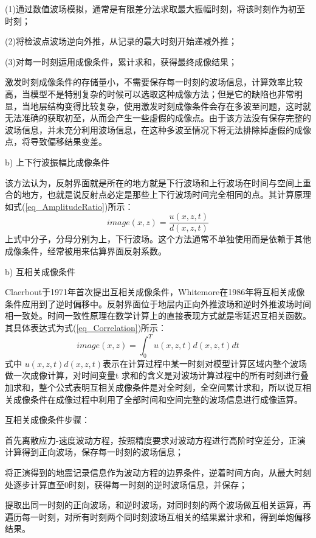 \documentclass[11pt]{article}
\begin{document}
(1)通过数值波场模拟，通常是有限差分法求取最大振幅时刻，将该时刻作为初至时刻；
\par
(2)将检波点波场逆向外推，从记录的最大时刻开始递减外推；
\par
(3)对每一时刻运用成像条件，累计求和，获得最终成像结果；
\par
激发时刻成像条件的存储量小，不需要保存每一时刻的波场信息，计算效率比较高，当模型不是特别复杂的时候可以选取这种成像方法；但是它的缺陷也非常明显，当地层结构变得比较复杂，使用激发时刻成像条件会存在多波至问题，这时就无法准确的获取初至，从而会产生一些虚假的成像点。由于该方法没有保存完整的波场信息，并未充分利用波场信息，在这种多波至情况下将无法排除掉虚假的成像点，将导致偏移结果变差。
\par
b) 上下行波振幅比成像条件
\par
该方法认为，反射界面就是所在的地方就是下行波场和上行波场在时间与空间上重合的地方，也就是说反射点必定是那些上下行波场时间完全相同的点。其计算原理如式(\ref{eq_AmplitudeRatio})所示：
\begin{equation}\label{eq_AmplitudeRatio}
image(x,z)=\frac{u(x,z,t)}{d(x,z,t)}
\end{equation}
上式中分子，分母分别为上，下行波场。这个方法通常不单独使用而是依赖于其他成像条件，经常被用来估算界面反射系数。
\par
b) 互相关成像条件
\par
Claerbout于1971年首次提出互相关成像条件，Whitemore在1986年将互相关成像条件应用到了逆时偏移中。反射界面位于地层内正向外推波场和逆时外推波场时间相一致处。时间一致性原理在数学计算上的直接表现方式就是零延迟互相关函数。其具体表达式为式(\ref{eq_Correlation})所示：
\begin{equation}\label{eq_Correlation}
image(x,z)=\int_0^T u(x,z,t) d(x,z,t) dt
\end{equation}
式中 $u(x,z,t)d(x,z,t)$表示在计算过程中某一时刻对模型计算区域内整个波场做一次成像计算，对时间变量t 求和的含义是对波场计算过程中的所有时刻进行叠加求和，整个公式表明互相关成像条件是对全时刻，全空间累计求和，所以说互相关成像条件在成像过程中利用了全部时间和空间完整的波场信息进行成像运算。
\par
互相关成像条件步骤：
\par
首先离散应力-速度波动方程，按照精度要求对波动方程进行高阶时空差分，正演计算得到正向波场，保存每一时刻的波场信息；
\par
将正演得到的地震记录信息作为波动方程的边界条件，逆着时间方向，从最大时刻处逐步计算直至0时刻，获得每一时刻的逆时波场信息，并保存；
\par
提取出同一时刻的正向波场，和逆时波场，对同时刻的两个波场做互相关运算，再遍历每一时刻，对所有时刻两个同时刻波场互相关的结果累计求和，得到单炮偏移结果。
\end{document}
